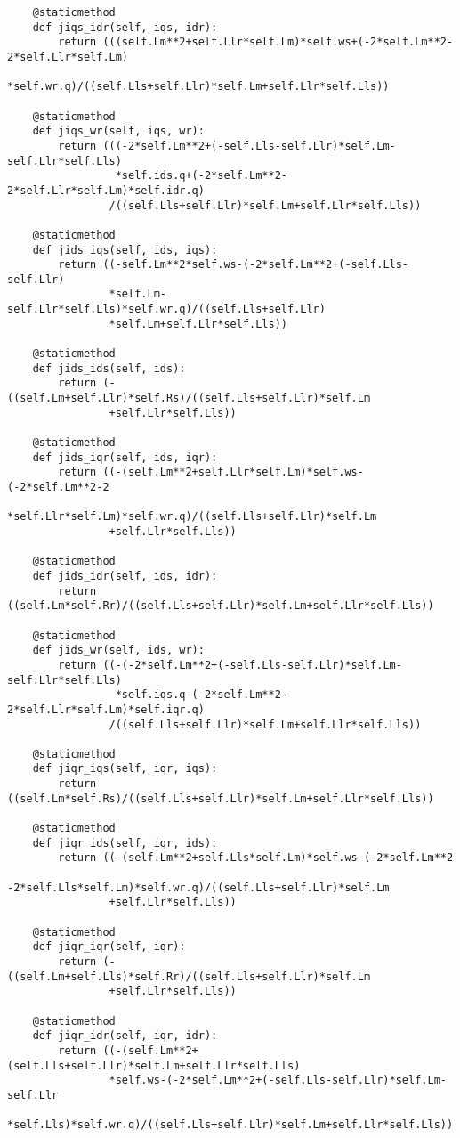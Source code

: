 \begin{lstlisting}
    @staticmethod
    def jiqs_idr(self, iqs, idr):
        return (((self.Lm**2+self.Llr*self.Lm)*self.ws+(-2*self.Lm**2-2*self.Llr*self.Lm)
                 *self.wr.q)/((self.Lls+self.Llr)*self.Lm+self.Llr*self.Lls))

    @staticmethod
    def jiqs_wr(self, iqs, wr):
        return (((-2*self.Lm**2+(-self.Lls-self.Llr)*self.Lm-self.Llr*self.Lls)
                 *self.ids.q+(-2*self.Lm**2-2*self.Llr*self.Lm)*self.idr.q)
                /((self.Lls+self.Llr)*self.Lm+self.Llr*self.Lls))

    @staticmethod
    def jids_iqs(self, ids, iqs):
        return ((-self.Lm**2*self.ws-(-2*self.Lm**2+(-self.Lls-self.Llr)
                *self.Lm-self.Llr*self.Lls)*self.wr.q)/((self.Lls+self.Llr)
                *self.Lm+self.Llr*self.Lls))

    @staticmethod
    def jids_ids(self, ids):
        return (-((self.Lm+self.Llr)*self.Rs)/((self.Lls+self.Llr)*self.Lm
                +self.Llr*self.Lls))

    @staticmethod
    def jids_iqr(self, ids, iqr):
        return ((-(self.Lm**2+self.Llr*self.Lm)*self.ws-(-2*self.Lm**2-2
                *self.Llr*self.Lm)*self.wr.q)/((self.Lls+self.Llr)*self.Lm
                +self.Llr*self.Lls))

    @staticmethod
    def jids_idr(self, ids, idr):
        return ((self.Lm*self.Rr)/((self.Lls+self.Llr)*self.Lm+self.Llr*self.Lls))

    @staticmethod
    def jids_wr(self, ids, wr):
        return ((-(-2*self.Lm**2+(-self.Lls-self.Llr)*self.Lm-self.Llr*self.Lls)
                 *self.iqs.q-(-2*self.Lm**2-2*self.Llr*self.Lm)*self.iqr.q)
                /((self.Lls+self.Llr)*self.Lm+self.Llr*self.Lls))

    @staticmethod
    def jiqr_iqs(self, iqr, iqs):
        return ((self.Lm*self.Rs)/((self.Lls+self.Llr)*self.Lm+self.Llr*self.Lls))

    @staticmethod
    def jiqr_ids(self, iqr, ids):
        return ((-(self.Lm**2+self.Lls*self.Lm)*self.ws-(-2*self.Lm**2
                -2*self.Lls*self.Lm)*self.wr.q)/((self.Lls+self.Llr)*self.Lm
                +self.Llr*self.Lls))

    @staticmethod
    def jiqr_iqr(self, iqr):
        return (-((self.Lm+self.Lls)*self.Rr)/((self.Lls+self.Llr)*self.Lm
                +self.Llr*self.Lls))

    @staticmethod
    def jiqr_idr(self, iqr, idr):
        return ((-(self.Lm**2+(self.Lls+self.Llr)*self.Lm+self.Llr*self.Lls)
                *self.ws-(-2*self.Lm**2+(-self.Lls-self.Llr)*self.Lm-self.Llr
                *self.Lls)*self.wr.q)/((self.Lls+self.Llr)*self.Lm+self.Llr*self.Lls))


\end{lstlisting}
